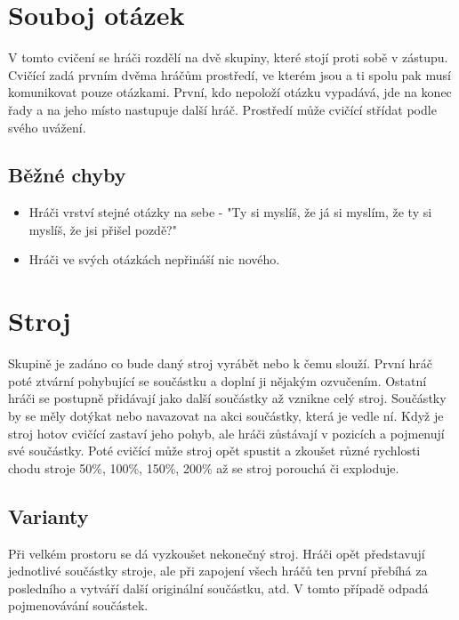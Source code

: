 \documentclass[main.tex]{subfiles}
\begin{document}
 
 
 
 
\needspace{5cm} \section{Souboj otázek} \label{souboj otázek} V tomto cvičení se hráči rozdělí na dvě skupiny, které stojí proti sobě v zástupu. Cvičící zadá prvním dvěma hráčům prostředí, ve kterém jsou a ti spolu pak musí komunikovat pouze otázkami. První, kdo nepoloží otázku vypadává, jde na konec řady a na jeho místo nastupuje další hráč. Prostředí může cvičící střídat podle svého uvážení. 
 
\subsection{ Běžné chyby } \begin{itemize}
\item Hráči vrství stejné otázky na sebe - "Ty si myslíš, že já si myslím, že ty si myslíš, že jsi přišel pozdě?"
\item Hráči ve svých otázkách nepřináší nic nového.
\end{itemize}
 
  
 
 
 
\needspace{5cm} \section{Stroj} \label{stroj} Skupině je zadáno co bude daný stroj vyrábět nebo k čemu slouží. První hráč poté ztvární pohybující se součástku a doplní ji nějakým ozvučením. Ostatní hráči se postupně přidávají jako další součástky až vznikne celý stroj. Součástky by se měly dotýkat nebo navazovat na akci součástky, která je vedle ní. Když je stroj hotov cvičící zastaví jeho pohyb, ale hráči zůstávají v pozicích a pojmenují své součástky. Poté cvičící může stroj opět spustit a zkoušet různé rychlosti chodu stroje 50\%{}, 100\%{}, 150\%{}, 200\%{} až se stroj porouchá či exploduje. 
 
\subsection{ Varianty } Při velkém prostoru se dá vyzkoušet nekonečný stroj. Hráči opět představují jednotlivé součástky stroje, ale při zapojení všech hráčů ten první přebíhá za posledního a vytváří další originální součástku, atd. V tomto případě odpadá pojmenovávání součástek. 
 
\end{document}
